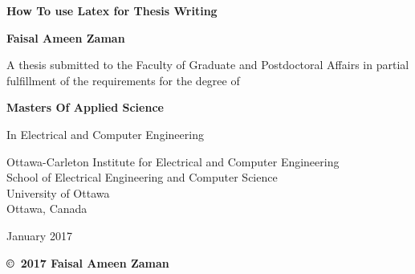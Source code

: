 \documentclass[12pt,english,oneside,letterpaper]{report}
\begin{document}
\author{Faisal Ameen Zaman}
\begin{titlepage}
\begin{center}
 {\huge \textbf{How To use Latex for Thesis Writing}}
\vspace*{0.2cm}
\begin{center}
{\Large {\textbf{Faisal Ameen Zaman}}} 
\end{center}
\vspace*{0.2cm}
\begin{center}
{ A thesis submitted to the Faculty of Graduate and Postdoctoral Affairs in partial fulfillment of the requirements for the degree of} 
\end{center}
\vspace*{0.2cm}
\begin{center}
{\Large {\textbf{Masters Of Applied Science}}} 
\end{center}
\begin{center}
{ In Electrical and Computer Engineering} 
\end{center}
\vspace*{1.0cm}
\begin{center}
{Ottawa-Carleton Institute for Electrical and Computer Engineering\\
School of Electrical Engineering and Computer Science\\
University of Ottawa\\
Ottawa, Canada} 
\end{center}
\begin{center}
{ January 2017} 
\end{center}
\vspace*{1.0cm}

\begin{center}
{\textbf{\copyright \ 2017 Faisal Ameen Zaman}} 
\end{center}
\end{center}
\end{titlepage}
\end{document}
